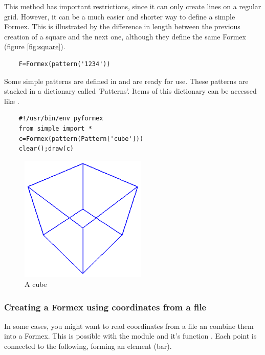 This method has important restrictions, since it can only create lines on a regular grid. However, it can be a much easier and shorter way to define a simple Formex. This is illustrated by the difference in length between the previous creation of a square and the next one, although they define the same Formex (figure \ref{fig:square}).
\begin{verbatim}
	F=Formex(pattern('1234'))
\end{verbatim}

Some simple patterns are defined in  and are ready for use. These patterns are stacked in a dictionary called 'Patterns'. Items of this dictionary can be accessed like .
\begin{verbatim}
	#!/usr/bin/env pyformex
	from simple import *
	c=Formex(pattern(Pattern['cube']))
	clear();draw(c)
\end{verbatim}

\begin{figure}[ht]
  \centering
  \begin{makeimage}
  \end{makeimage}
  \begin{latexonly}
    \includegraphics[width=6cm]{images/cube}
  \end{latexonly}
  \begin{htmlonly}
  \end{htmlonly}  
  \caption{A cube}
  \label{fig:cube}
\end{figure}

\subsubsection{Creating a Formex using coordinates from a file}
In some cases, you might want to read coordinates from a file an combine them into a Formex. This is possible with the module  and it's function . Each point is connected to the following, forming an element (bar).

